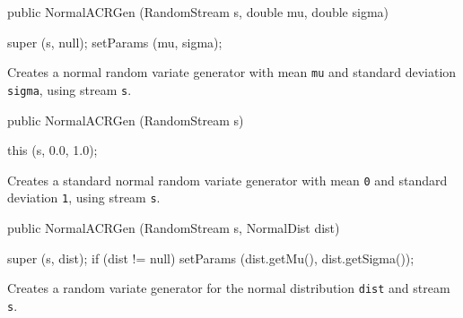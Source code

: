 \begin{code}

   public NormalACRGen (RandomStream s, double mu, double sigma) \begin{hide} {
      super (s, null);
      setParams (mu, sigma);
   }\end{hide}
\end{code} 
\begin{tabb}  Creates a normal random variate generator with mean \texttt{mu}
  and standard deviation \texttt{sigma}, using stream \texttt{s}. 
\end{tabb}
\begin{code}

   public NormalACRGen (RandomStream s) \begin{hide} {
      this (s, 0.0, 1.0);
   }\end{hide}
\end{code} 
\begin{tabb}  Creates a standard normal random variate generator with mean
  \texttt{0} and standard deviation \texttt{1}, using stream \texttt{s}. 
\end{tabb}
\begin{code}

   public NormalACRGen (RandomStream s, NormalDist dist) \begin{hide} {
      super (s, dist);
      if (dist != null)
         setParams (dist.getMu(), dist.getSigma());
   }\end{hide}
\end{code} 
 \begin{tabb}  Creates a random variate generator for the normal distribution 
  \texttt{dist} and stream \texttt{s}. 
 \end{tabb}

